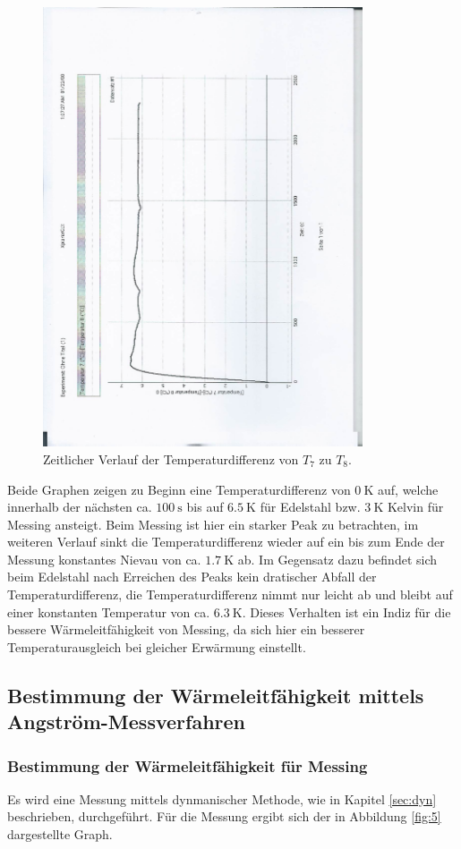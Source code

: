 \begin{figure}
  \centering
  \includegraphics[height=13cm, angle=270]{scan-5.jpg}
  \caption{Zeitlicher Verlauf der Temperaturdifferenz von $T_7$ zu $T_8$.}
  \label{fig:4}
\end{figure}

Beide Graphen zeigen zu Beginn eine Temperaturdifferenz von $\SI{0}{\kelvin}$ auf, welche innerhalb der nächsten ca. $\SI{100}{\second}$ bis auf $\SI{6.5}{\kelvin}$ für Edelstahl bzw. $\SI{3}{\kelvin}$ Kelvin für Messing ansteigt.
Beim Messing ist hier ein starker Peak zu betrachten, im weiteren Verlauf sinkt die Temperaturdifferenz wieder auf ein bis zum Ende der Messung konstantes Nievau von ca. $\SI{1.7}{\kelvin}$ ab.
Im Gegensatz dazu befindet sich beim Edelstahl nach Erreichen des Peaks kein dratischer Abfall der Temperaturdifferenz, die Temperaturdifferenz nimmt nur leicht ab und bleibt auf einer konstanten Temperatur von ca. $\SI{6.3}{\kelvin}$.
Dieses Verhalten ist ein Indiz für die bessere Wärmeleitfähigkeit von Messing, da sich hier ein besserer Temperaturausgleich bei gleicher Erwärmung einstellt.

\subsection{Bestimmung der Wärmeleitfähigkeit mittels Angström-Messverfahren}
\subsubsection{Bestimmung der Wärmeleitfähigkeit für Messing}
Es wird eine Messung mittels dynmanischer Methode, wie in Kapitel \ref{sec:dyn} beschrieben, durchgeführt.
Für die Messung ergibt sich der in Abbildung \ref{fig:5} dargestellte Graph.

